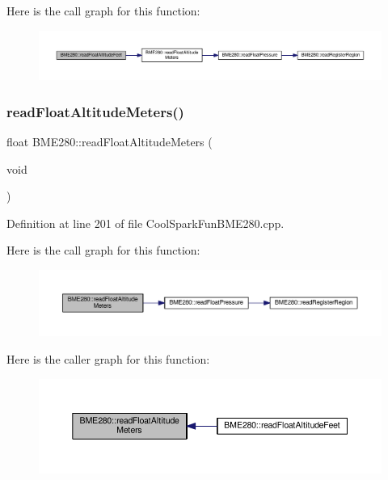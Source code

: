 Here is the call graph for this function\+:
\nopagebreak
\begin{figure}[H]
\begin{center}
\leavevmode
\includegraphics[width=350pt]{class_b_m_e280_a6525c8a26f887b52596c86bed99343cb_cgraph}
\end{center}
\end{figure}
\mbox{\label{class_b_m_e280_af67b56ba50760ee1d116acc6c5010221}} 
\subsubsection{\texorpdfstring{read\+Float\+Altitude\+Meters()}{readFloatAltitudeMeters()}}
{\footnotesize\ttfamily float B\+M\+E280\+::read\+Float\+Altitude\+Meters (\begin{DoxyParamCaption}\item[{void}]{ }\end{DoxyParamCaption})}



Definition at line 201 of file Cool\+Spark\+Fun\+B\+M\+E280.\+cpp.

Here is the call graph for this function\+:
\nopagebreak
\begin{figure}[H]
\begin{center}
\leavevmode
\includegraphics[width=350pt]{class_b_m_e280_af67b56ba50760ee1d116acc6c5010221_cgraph}
\end{center}
\end{figure}
Here is the caller graph for this function\+:
\nopagebreak
\begin{figure}[H]
\begin{center}
\leavevmode
\includegraphics[width=350pt]{class_b_m_e280_af67b56ba50760ee1d116acc6c5010221_icgraph}
\end{center}
\end{figure}
\mbox{\label{class_b_m_e280_a42ea7232039eebf5aadb391ef6132c35}} 
